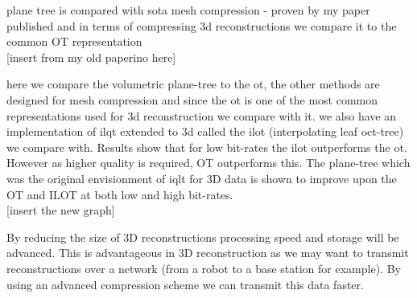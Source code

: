
plane tree is compared with sota mesh compression - proven by my paper published and in terms of compressing 3d reconstructions we compare it to the common OT representation \\

[insert from my old paperino here]


here we compare the volumetric plane-tree to the ot, the other methods are designed for mesh compression and since the ot is one of the most common representations used for 3d reconstruction we compare with it. we also have an implementation of ilqt extended to 3d called the ilot (interpolating leaf oct-tree) we compare with. Results show that for low bit-rates the ilot outperforms the ot. However as higher quality is required, OT outperforms this. The plane-tree which was the original envisionment of iqlt for 3D data is shown to improve upon the OT and ILOT at both low and high bit-rates. \\

[insert the new graph]

By reducing the size of 3D reconstructions processing speed and storage will be advanced. This is advantageous in 3D reconstruction as we may want to transmit reconstructions over a network (from a robot to a base station for example). By using an advanced compression scheme we can transmit this data faster. 